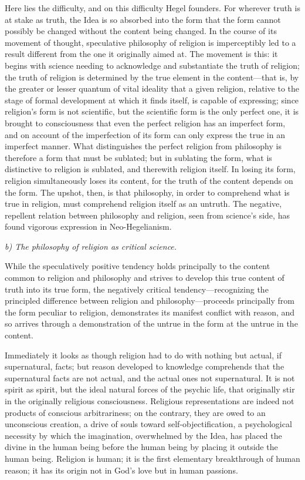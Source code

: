 \documentclass[12pt,a4paper]{article}
\begin{document}
Here lies the difficulty, and on this difficulty Hegel founders.
For wherever truth is at stake as truth, the Idea is so absorbed
into the form that the form cannot possibly be changed without
the content being changed. In the course of its movement of
thought, speculative philosophy of religion is imperceptibly led
to a result different from the one it originally aimed at. The
movement is this: it begins with science needing to acknowledge
and substantiate the truth of religion; the truth of religion is
determined by the true element in the content---that is, by the
greater or lesser quantum of vital ideality that a given
religion, relative to the stage of formal development at which
it finds itself, is capable of expressing; since religion's form
is not scientific, but the scientific form is the only perfect
one, it is brought to consciousness that even the perfect
religion has an imperfect form, and on account of the
imperfection of its form can only express the true in an
imperfect manner. What distinguishes the perfect religion from
philosophy is therefore a form that must be sublated; but in
sublating the form, what is distinctive to religion is sublated,
and therewith religion itself. In losing its form, religion
simultaneously loses its content, for the truth of the content
depends on the form. The upshot, then, is that philosophy, in
order to comprehend what is true in religion, must comprehend
religion itself as an untruth. The negative, repellent relation
between philosophy and religion, seen from science's side, has
found vigorous expression in Neo-Hegelianism.

\medskip
\noindent\textit{b) The philosophy of religion as critical science.}
\medskip

While the speculatively positive tendency holds principally to
the content common to religion and philosophy and strives to
develop this true content of truth into its true form, the
negatively critical tendency---recognizing the principled
difference between religion and philosophy---proceeds principally
from the form peculiar to religion, demonstrates its manifest
conflict with reason, and so arrives through a demonstration of
the untrue in the form at the untrue in the content.

Immediately it looks as though religion had to do with nothing
but actual, if supernatural, facts; but reason developed to
knowledge comprehends that the supernatural facts are not actual,
and the actual ones not supernatural. It is not spirit as spirit,
but the ideal natural forces of the psychic life, that originally
stir in the originally religious consciousness. Religious
representations are indeed not products of conscious
arbitrariness; on the contrary, they are owed to an unconscious
creation, a drive of souls toward self-objectification, a
psychological necessity by which the imagination, overwhelmed by
the Idea, has placed the divine in the human being before the
human being by placing it outside the human being. Religion is
human; it is the first elementary breakthrough of human reason;
it has its origin not in God's love but in human passions.
\end{document}

